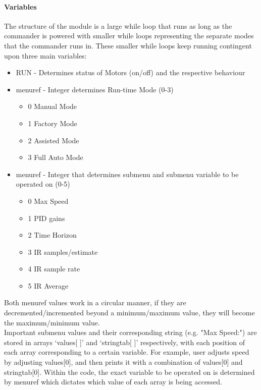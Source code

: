 	\paragraph{Variables} The structure of the module is a large while loop that runs as long as the commander is powered with smaller while loops representing the separate modes that the commander runs in. These smaller while loops keep running contingent upon three main variables:
	\begin{itemize}
		\item RUN - Determines status of Motors (on/off) and the respective behaviour
		\item menu\textunderscore ref - Integer determines Run-time Mode (0-3)
		\begin{itemize}
			\item 0  Manual Mode
			\item 1  Factory Mode
			\item 2  Assisted Mode
			\item 3  Full Auto Mode
		\end{itemize}
		\item menu\textunderscore ref - Integer that determines submenu and submenu variable to be operated on (0-5)
		\begin{itemize}
			\item 0  Max Speed
			\item 1  PID gains
			\item 2  Time Horizon
			\item 3  IR samples/estimate
			\item 4	 IR sample rate	
			\item 5  IR Average
		\end{itemize}
	\end{itemize}
	
	Both menu\textunderscore ref values work in a circular manner, if they are decremented/incremented beyond a minimum/maximum value, they will become the maximum/minimum value.\\
	Important submenu values and their corresponding string (e.g. "Max Speed:") are stored in arrays `values[ ]' and `stringtab[ ]' respectively, with each position of each array corresponding to a certain variable. For example, user adjusts speed by adjusting values[0], and then prints it with a combination of values[0] and stringtab[0]. Within the code, the exact variable to be operated on is determined by menu\textunderscore ref which dictates which value of each array is being accessed.\\
	

